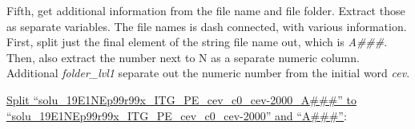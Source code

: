 \documentclass[
]{book}
\newenvironment{Shaded}{\begin{snugshade}}{\end{snugshade}}
\newcommand{\AttributeTok}[1]{\textcolor[rgb]{0.77,0.63,0.00}{#1}}
\newcommand{\CommentTok}[1]{\textcolor[rgb]{0.56,0.35,0.01}{\textit{#1}}}
\newcommand{\ConstantTok}[1]{\textcolor[rgb]{0.00,0.00,0.00}{#1}}
\newcommand{\DecValTok}[1]{\textcolor[rgb]{0.00,0.00,0.81}{#1}}
\newcommand{\FunctionTok}[1]{\textcolor[rgb]{0.00,0.00,0.00}{#1}}
\newcommand{\NormalTok}[1]{#1}
\newcommand{\OtherTok}[1]{\textcolor[rgb]{0.56,0.35,0.01}{#1}}
\newcommand{\SpecialCharTok}[1]{\textcolor[rgb]{0.00,0.00,0.00}{#1}}
\newcommand{\StringTok}[1]{\textcolor[rgb]{0.31,0.60,0.02}{#1}}
\begin{document}
Fifth, get additional information from the file name and file folder. Extract those as separate variables. The file names is dash connected, with various information. First, split just the final element of the string file name out, which is \emph{A\#\#\#}. Then, also extract the number next to N as a separate numeric column. Additional \emph{folder\_lvl1} separate out the numeric number from the initial word \emph{cev}.

\href{https://stackoverflow.com/a/50518154/8280804}{Split ``solu\_19E1NEp99r99x\_ITG\_PE\_cev\_c0\_cev-2000\_A\#\#\#'' to ``solu\_19E1NEp99r99x\_ITG\_PE\_cev\_c0\_cev-2000'' and ``A\#\#\#''}:

\begin{Shaded}
\end{Shaded}
\end{document}
